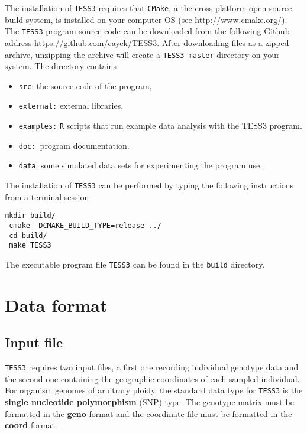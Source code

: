\documentclass[10pt,a4paper]{article}
\begin{document}
The installation of {\tt TESS3} requires that {\tt CMake}, a the cross-platform open-source build system, is installed on your computer OS (see \url{ http://www.cmake.org/}).  The {\tt TESS3}  program source code can be downloaded from the following Github address \url{https://github.com/cayek/TESS3}. After downloading files as a zipped archive, unzipping the archive will create a {\tt TESS3-master} directory on your system. The  directory contains 
\begin{itemize}
\item   {\tt src}: the source code of the program,

\item   {\tt external:} external libraries,

\item   {\tt examples:} {\tt R} scripts that run example data analysis with the TESS3 program.

\item     {\tt doc: }program documentation.

\item     {\tt data}: some simulated data sets for experimenting the program use.
\end{itemize}
\noindent The installation of {\tt TESS3} can be performed by typing the following instructions from a terminal session 

\begin{Verbatim}[frame = single]
 mkdir build/
 cmake -DCMAKE_BUILD_TYPE=release ../
 cd build/
 make TESS3
  \end{Verbatim}

 \noindent The executable program file {\tt TESS3} can be found in the {\tt build} directory.  
  
\section{Data format}

\subsection{Input file}

{\tt TESS3} requires two input files, a first one recording individual genotype data and the second one containing the geographic coordinates of  each sampled individual. For organism genomes of arbitrary ploidy, the standard data type for {\tt TESS3} is the {\bf single nucleotide polymorphism} (SNP) type.  The genotype matrix must be formatted in the {\bf geno} format and the coordinate file must be formatted in the {\bf coord} format.
\end{document}
